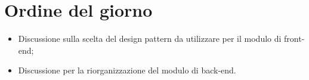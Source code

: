 \section{Ordine del giorno}
\begin{itemize}
\item Discussione sulla scelta del design pattern da utilizzare per il modulo di front-end;
\item Discussione per la riorganizzazione del modulo di back-end.
\end{itemize}